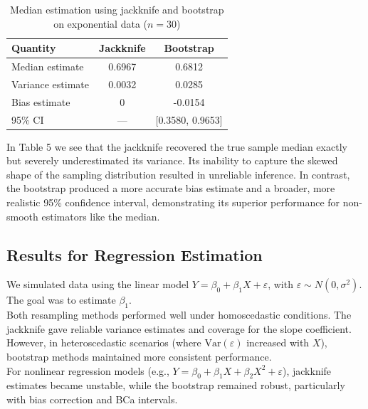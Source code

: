 \documentclass{article}
\begin{document}
\begin{table}[h!]
\centering
\caption{Median estimation using jackknife and bootstrap on exponential data ($n=30$)}
\begin{tabular}{|l|c|c|}
\hline
\textbf{Quantity} & \textbf{Jackknife} & \textbf{Bootstrap} \\
\hline
Median estimate     & 0.6967 & 0.6812 \\
Variance estimate   & 0.0032 & 0.0285 \\
Bias estimate       & 0      & -0.0154 \\
95\% CI             & ---    & [0.3580, 0.9653] \\
\hline
\end{tabular}
\label{tab:median-exp}
\end{table}

In Table 5 we see that the jackknife recovered the true sample median exactly but severely underestimated its variance. Its inability to capture the skewed shape of the sampling distribution resulted in unreliable inference. In contrast, the bootstrap produced a more accurate bias estimate and a broader, more realistic 95\% confidence interval, demonstrating its superior performance for non-smooth estimators like the median.




\newpage

\subsection{Results for Regression Estimation}

We simulated data using the linear model \( Y = \beta_0 + \beta_1 X + \varepsilon \), with \( \varepsilon \sim N(0, \sigma^2) \). The goal was to estimate \( \beta_1 \). \\

Both resampling methods performed well under homoscedastic conditions. The jackknife gave reliable variance estimates and coverage for the slope coefficient. However, in heteroscedastic scenarios (where \( \text{Var}(\varepsilon) \) increased with \( X \)), bootstrap methods maintained more consistent performance.\\

For nonlinear regression models (e.g., \( Y = \beta_0 + \beta_1 X + \beta_2 X^2 + \varepsilon \)), jackknife estimates became unstable, while the bootstrap remained robust, particularly with bias correction and BCa intervals.\\
\end{document}
